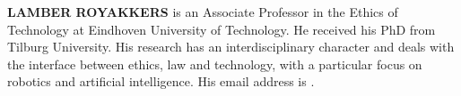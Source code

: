 \documentclass{scspaperproc}
\theoremstyle{scsthe}
\begin{document}
\textbf{\uppercase{LAMBER ROYAKKERS}} is an Associate Professor in the Ethics of Technology at Eindhoven University of Technology. He received his PhD from Tilburg University. His research has an interdisciplinary character and deals with the interface between ethics, law and technology, with a particular focus on robotics and artificial intelligence. His email address is .
\end{document}
